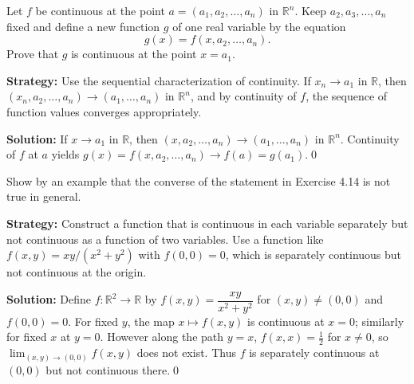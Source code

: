 \begin{problembox}
\begin{problemstatement}
Let \( f \) be continuous at the point \( a = (a_1, a_2, \ldots, a_n) \) in \( \mathbb{R}^n \). Keep \( a_2, a_3, \ldots, a_n \) fixed and define a new function \( g \) of one real variable by the equation
\[g(x) = f(x, a_2, \ldots, a_n).\]
Prove that \( g \) is continuous at the point \( x = a_1 \).
\end{problemstatement}
\end{problembox}

\noindent\textbf{Strategy:} Use the sequential characterization of continuity. If $x_n \to a_1$ in $\mathbb{R}$, then $(x_n, a_2, \ldots, a_n) \to (a_1, \ldots, a_n)$ in $\mathbb{R}^n$, and by continuity of $f$, the sequence of function values converges appropriately.

\bigskip\noindent\textbf{Solution:}
If $x\to a_1$ in $\mathbb{R}$, then $(x,a_2,\ldots,a_n)\to(a_1,\ldots,a_n)$ in $\mathbb{R}^n$. Continuity of $f$ at $a$ yields $g(x)=f(x,a_2,\ldots,a_n)\to f(a)=g(a_1)$.\qed



\begin{problembox}
\begin{problemstatement}
Show by an example that the converse of the statement in Exercise 4.14 is not true in general.
\end{problemstatement}
\end{problembox}

\noindent\textbf{Strategy:} Construct a function that is continuous in each variable separately but not continuous as a function of two variables. Use a function like $f(x,y) = xy/(x^2+y^2)$ with $f(0,0) = 0$, which is separately continuous but not continuous at the origin.

\bigskip\noindent\textbf{Solution:}
Define $f:\mathbb{R}^2\to\mathbb{R}$ by $f(x,y)=\dfrac{xy}{x^2+y^2}$ for $(x,y)\ne(0,0)$ and $f(0,0)=0$. For fixed $y$, the map $x\mapsto f(x,y)$ is continuous at $x=0$; similarly for fixed $x$ at $y=0$. However along the path $y=x$, $f(x,x)=\tfrac{1}{2}$ for $x\ne0$, so $\lim_{(x,y)\to(0,0)}f(x,y)$ does not exist. Thus $f$ is separately continuous at $(0,0)$ but not continuous there.\qed



